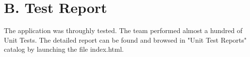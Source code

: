 \documentclass[a4paper,11pt,twoside]{report}
\theoremstyle{definition}
\begin{document}
\begin{enumerate}
\begin{enumerate}
\end{enumerate}

\end{enumerate}


\chapter*{B. Test Report}

The application was throughly tested. The team performed almost a hundred of Unit Tests. The detailed report can be found and browsed in "Unit Test Reports" catalog by launching the file index.html.
\thispagestyle{empty}
\end{document}
